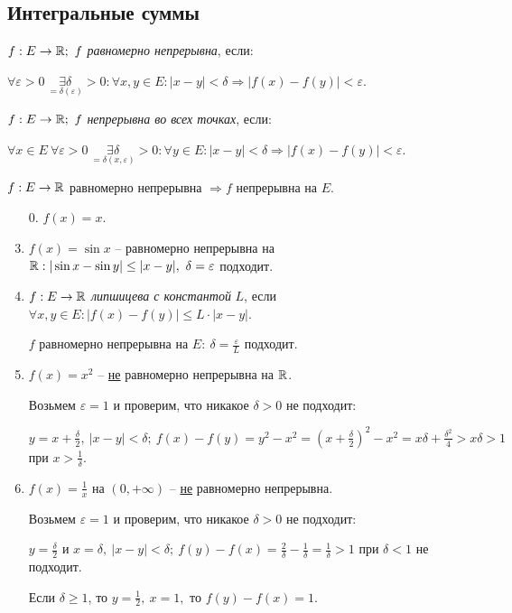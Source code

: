 \subsection{Интегральные суммы}
\begin{definition}
    $f:E\rightarrow \mathbb{R};\ f$ \textit{равномерно непрерывна}, если:
    
    $\forall \varepsilon>0\ \underset{=\delta(\varepsilon)}{\exists\delta} >0: \forall x, y\in E: |x-y|<\delta\Rightarrow |f(x)-f(y)|<\varepsilon$.
\end{definition}

\begin{remark}
    $f:E\rightarrow \mathbb{R};\ f$  \textit{непрерывна во всех точках}, если: 
    
    $\forall x\in E\ \forall \varepsilon>0\ \underset{=\delta(x, \varepsilon)}{\exists\delta} >0:\forall y\in E:|x-y|<\delta\Rightarrow |f(x)-f(y)|<\varepsilon$.
\end{remark}

\begin{statement}
    $f:E\rightarrow \mathbb{R}$ равномерно непрерывна $\Rightarrow f$ непрерывна на $E$.
\end{statement}

\begin{example}
    \begin{enumerate}
        \item[]
        \item[0.] $f(x)=x$.
        \item $f(x) = \sin x$ – равномерно непрерывна на $\mathbb{R}: |\sin x-\sin y|\leq |x-y|,\ \delta=\varepsilon$ подходит.
        \item $f:E\rightarrow \mathbb{R}$ \textit{липшицева с константой} $L$, если $\forall x, y\in E: |f(x)-f(y)|\leq L\cdot|x-y|$.
        
        $f$ равномерно непрерывна на $E:\ \delta=\frac{\varepsilon}{L}$ подходит.
        \item $f(x)=x^2$ – \underline{не} равномерно непрерывна на $\mathbb{R}$.

        Возьмем $\varepsilon=1$ и проверим, что никакое $\delta>0$ не подходит:

        $y=x+\frac{\delta}{2},\ |x-y|<\delta;\ f(x)-f(y)=y^2-x^2=(x+\frac{\delta}{2})^2-x^2=x\delta+\frac{\delta^2}{4}>x\delta >1$ при $x>\frac{1}{\delta}$.
        \item $f(x)=\frac{1}{x}$ на $(0,+\infty)$ – \underline{не} равномерно непрерывна.

        Возьмем $\varepsilon=1$ и проверим, что никакое $\delta>0$ не подходит:

        $y=\frac{\delta}{2}$ и $x=\delta,\ |x-y|<\delta;\ f(y)-f(x)=\frac{2}{\delta}-\frac{1}{\delta}=\frac{1}{\delta}>1$ при $\delta<1$ не подходит.

        Если $\delta\geq 1$, то $y=\frac{1}{2},\ x=1,$ то $f(y)-f(x)=1$.
    \end{enumerate}
\end{example}

